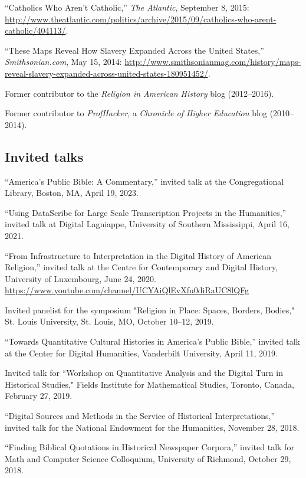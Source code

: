 \documentclass[11pt]{article}
\begin{document}
``Catholics Who Aren't Catholic,'' \emph{The Atlantic}, September 8, 2015:  \url{http://www.theatlantic.com/politics/archive/2015/09/catholics-who-arent-catholic/404113/}.

``These Maps Reveal How Slavery Expanded Across the United States,'' \emph{Smithsonian.com}, May 15, 2014: \url{http://www.smithsonianmag.com/history/maps-reveal-slavery-expanded-across-united-states-180951452/}.

Former contributor to the \emph{Religion in American History} blog (2012--2016).

Former contributor to \emph{ProfHacker}, a \emph{Chronicle of Higher Education} blog (2010--2014). 

\subsection{Invited talks}\label{Invited talks}

``America's Public Bible: A Commentary,'' invited talk at the Congregational Library, Boston, MA, April 19, 2023.

``Using DataScribe for Large Scale Transcription Projects in the Humanities,'' invited talk at Digital Lagniappe, University of Southern Mississippi, April 16, 2021.

``From Infrastructure to Interpretation in the Digital History of American Religion,'' invited talk at the Centre for Contemporary and Digital History, University of Luxembourg, June 24, 2020. \url{https://www.youtube.com/channel/UCYAiQlEvXfu0diRaUC8lQFg}

Invited panelist for the symposium "Religion in Place: Spaces, Borders, Bodies," St. Louis University, St. Louis, MO, October 10--12, 2019.

``Towards Quantitative Cultural Histories in America's Public Bible,'' invited talk at the Center for Digital Humanities, Vanderbilt University, April 11, 2019.

Invited talk for ``Workshop on Quantitative Analysis and the Digital Turn in Historical Studies," Fields Institute for Mathematical Studies, Toronto, Canada, February 27, 2019.

``Digital Sources and Methods in the Service of Historical Interpretations,'' invited talk for the National Endowment for the Humanities, November 28, 
2018.

``Finding Biblical Quotations in Historical Newspaper Corpora,'' invited talk for Math and Computer Science Colloquium, University of Richmond, October 29, 2018.
\end{document}
